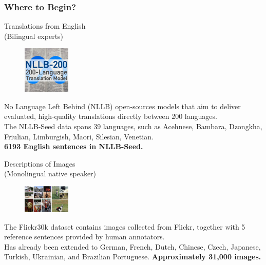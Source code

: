\documentclass[aspectratio=169]{beamer}
\begin{document}
\begin{frame}[fragile]
	\frametitle{Where to Begin?}
    \begin{minipage}{.50\textwidth}
    \centering
    Translations from English \\
    (Bilingual experts)
    \begin{figure}
        \includegraphics[width=0.2\textwidth]{images/nllb-logo.png} 
    \end{figure}
    \footnotesize 
    No Language Left Behind (NLLB) open-sources models that aim to deliver evaluated, high-quality translations directly between 200 languages. \\
    The NLLB-Seed data spans 39 languages, such as Acehnese, Bambara, Dzongkha, Friulian, Limburgish, Maori, Silesian, Venetian. \\
    \normalsize
    \textbf{6193 English sentences in NLLB-Seed.}
    \end{minipage}%
    \begin{minipage}{.50\textwidth}
    \centering
    Descriptions of Images \\
    (Monolingual native speaker)
    \begin{figure}
        \includegraphics[width=0.2\textwidth]{images/flickr30k-logo.png} 
    \end{figure}
    \footnotesize 
    The Flickr30k dataset contains images collected from Flickr, together with 5 reference sentences provided by human annotators. \\
    Has already been extended to German, French, Dutch, Chinese, Czech, Japanese, Turkish, Ukrainian, and Brazilian Portuguese.
    \normalsize
    \textbf{Approximately 31,000 images.}
    \end{minipage}
\end{frame}
\end{document}
